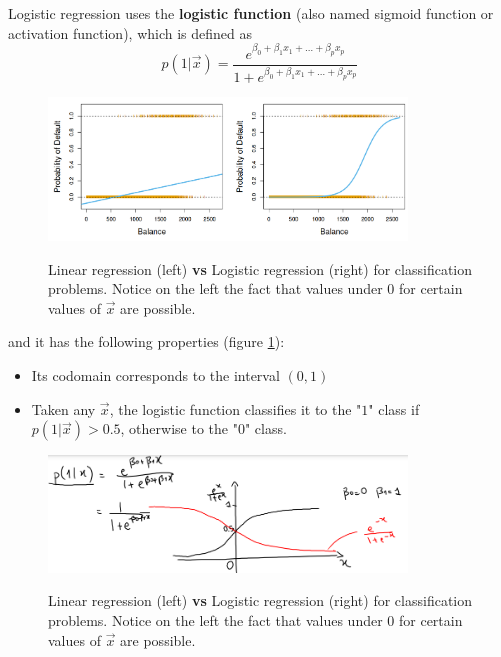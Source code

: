     Logistic regression uses the \textbf{logistic function} (also named sigmoid
    function or activation function), which is defined as
    $$p(1|\vec{x}) = \frac{e^{\beta_0 + \beta_1 x_1 + \dots + \beta_p x_p}}
                          {1+e^{\beta_0 + \beta_1 x_1 + \dots + \beta_p x_p}}$$                          
               
\begin{figure}[ht]
\caption{Linear regression (left) \textbf{vs} Logistic regression (right) for
classification problems. Notice on the left the fact that values under $0$ for
certain values of $\vec{x}$ are possible.}
\centering
\includegraphics[width=0.85\textwidth]{LogisticReg}
\label{LogvsReg}
\end{figure}           
                          
    and it has the following properties (figure \ref{LogvsReg}):
    \begin{itemize}
      \item Its codomain corresponds to the interval $(0,1)$
      \item Taken any $ \vec{x} $, the logistic function classifies it to the
      "$1$" class if $p(1|\vec{x}) > 0.5$, otherwise to the "$0$" class.
    \end{itemize}

    \begin{figure}[ht]
      \caption{Linear regression (left) \textbf{vs} Logistic regression (right) for
      classification problems. Notice on the left the fact that values under $0$ for
      certain values of $\vec{x}$ are possible.}
      \centering
      \includegraphics[width=0.85\textwidth]{logRegressionBernoulli}
      \label{classification: logRegExample}
      \end{figure}    

